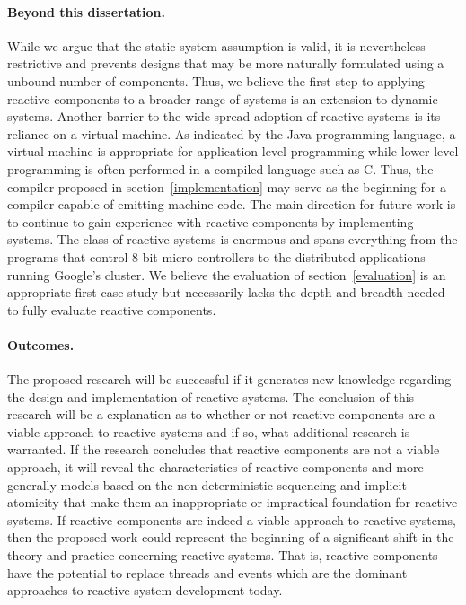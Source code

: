\paragraph{Beyond this dissertation.}
While we argue that the static system assumption is valid, it is nevertheless restrictive and prevents designs that may be more naturally formulated using a unbound number of components.
Thus, we believe the first step to applying reactive components to a broader range of systems is an extension to dynamic systems.
Another barrier to the wide-spread adoption of reactive systems is its reliance on a virtual machine.
As indicated by the Java programming language, a virtual machine is appropriate for application level programming while lower-level programming is often performed in a compiled language such as C.
Thus, the compiler proposed in section~\ref{implementation} may serve as the beginning for a compiler capable of emitting machine code.
The main direction for future work is to continue to gain experience with reactive components by implementing systems.
The class of reactive systems is enormous and spans everything from the programs that control 8-bit micro-controllers to the distributed applications running Google's cluster.
We believe the evaluation of section~\ref{evaluation} is an appropriate first case study but necessarily lacks the depth and breadth needed to fully evaluate reactive components.

\paragraph{Outcomes.}
The proposed research will be successful if it generates new knowledge regarding the design and implementation of reactive systems.
The conclusion of this research will be a explanation as to whether or not reactive components are a viable approach to reactive systems and if so, what additional research is warranted.
If the research concludes that reactive components are not a viable approach, it will reveal the characteristics of reactive components and more generally models based on the non-deterministic sequencing and implicit atomicity that make them an inappropriate or impractical foundation for reactive systems.
If reactive components are indeed a viable approach to reactive systems, then the proposed work could represent the beginning of a significant shift in the theory and practice concerning reactive systems.
That is, reactive components have the potential to replace threads and events which are the dominant approaches to reactive system development today.

